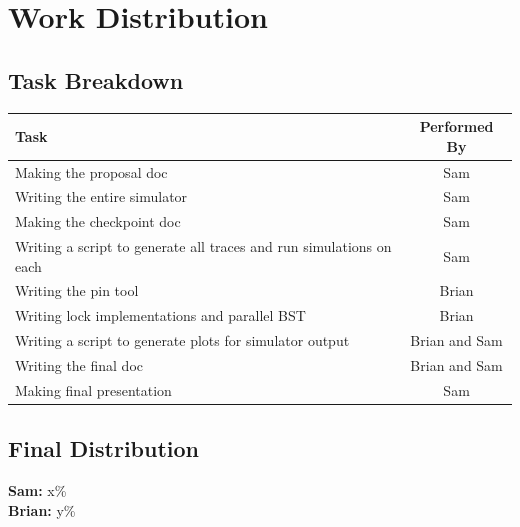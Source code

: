 \documentclass{article}
\begin{document}
\section{Work Distribution}

\subsection{Task Breakdown}
\begin{table}[H]
    \centering
    \renewcommand{\arraystretch}{1.5}
    \begin{tabular}{| p{.5\linewidth} | c |}
        \hline
        \textbf{Task} & \textbf{Performed By} \\
        \hline \hline
        Making the proposal doc & Sam \\
        \hline
        Writing the entire simulator & Sam \\
        \hline
        Making the checkpoint doc & Sam \\
        \hline
        Writing a script to generate all traces and run simulations on each & Sam \\
        \hline
        Writing the pin tool & Brian \\
        \hline
        Writing lock implementations and parallel BST & Brian \\
        \hline
        Writing a script to generate plots for simulator output & Brian and Sam \\
        \hline
        Writing the final doc & Brian and Sam \\
        \hline
        Making final presentation & Sam \\
        \hline
    \end{tabular}
\end{table}

\subsection{Final Distribution}
\textbf{Sam: } x\% \\
\textbf{Brian: } y\%
\end{document}
